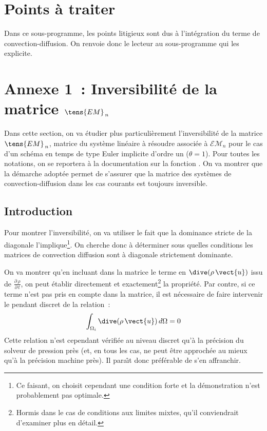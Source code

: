 \section*{Points à traiter}\label{Base_Covofi_section4}
Dans ce sous-programme, les points litigieux sont dus à l'intégration du
terme de convection-diffusion. On renvoie donc le lecteur au sous-programme
 qui les explicite.
\clearpage
\section*{Annexe 1~: Inversibilité de la matrice $\tens{EM}_{\,n}$ }
Dans cette section, on va étudier plus particulièrement l'inversibilité de
la matrice $\tens{EM}_{\,n}$, matrice du système linéaire
à résoudre associée à $\mathcal{EM}_{n}$ pour le cas d'un schéma en temps
de type Euler implicite d'ordre un ($\theta=1$). Pour toutes les notations, on
se reportera à la documentation sur la fonction .
On va montrer que la démarche adoptée permet de
s'assurer que la matrice des systèmes de convection-diffusion dans les cas
courants est toujours inversible.

\subsection*{\bf Introduction }

Pour montrer l'inversibilité, on va utiliser le fait que la dominance
stricte de la diagonale l'implique\footnote{Ce faisant, on choisit cependant une condition forte
et la démonstration n'est probablement pas optimale.}. On cherche donc à
déterminer sous quelles conditions les matrices de convection diffusion sont
à diagonale strictement dominante.

On va montrer qu'en incluant
dans la matrice le terme en $\dive(\rho \,\vect{u})$
issu de $\displaystyle \frac {{\partial}\,\rho}{{\partial}\,t}$, on peut
établir directement et exactement\footnote{Hormis
dans le cas de conditions aux limites mixtes, qu'il conviendrait d'examiner plus
en détail.} la propriété. Par contre, si ce terme n'est pas pris en compte dans la matrice,
il est nécessaire de faire intervenir le pendant discret de la relation~:
\begin{equation}\label{Base_Covofi_Eq_Div_Int}
\displaystyle \int_{\Omega_i} \dive (\rho\,\vect{u})\, d\Omega = 0
\end{equation}
Cette relation n'est cependant vérifiée au niveau discret qu'à la précision du
solveur de pression près (et, en tous les cas, ne peut être approchée au
mieux
qu'à la précision machine près). Il para\^\i t donc préférable de s'en
affranchir. \\


